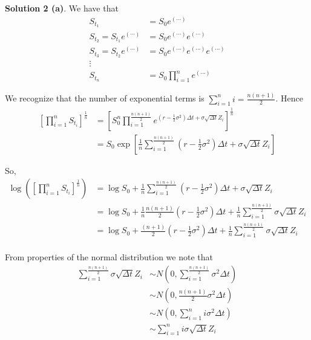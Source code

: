 \documentclass[12pt]{article}
\begin{document}
{\bf Solution 2 (a)}. We have that
\begin{align*}
	S_{t_1} &= S_0 e^{ (\cdots) } \\
	S_{t_2} = S_{t_1}e^{ (\cdots) } &= S_0 e^{ (\cdots) } e^{ (\cdots) } \\
	S_{t_3} = S_{t_2}e^{ (\cdots) } &= S_0 e^{ (\cdots) } e^{ (\cdots) } e^{ (\cdots) } \\	
	\vdots \\
	S_{t_n} &= S_0 \prod^n_{i = 1} e^{(\cdots)}	
\end{align*}

We recognize that the number of exponential terms is $\sum^n_{i = 1} i = \frac{n(n + 1)}{2}$. Hence
\begin{align*}
	\left[ \prod^n_{i = 1} S_{t_i} \right]^\frac{1}{n} &= \left[ S_0^n \prod^\frac{n(n + 1)}{2}_{i = 1} e^{ \left( r - \frac{1}{2}\sigma^2 \right)\Delta t + \sigma\sqrt{\Delta t}Z_i } \right]^\frac{1}{n} \\
	&= S_0 \exp \left[\frac{1}{n} \sum^\frac{n(n + 1)}{2}_{i = 1} \left( r - \frac{1}{2}\sigma^2 \right)\Delta t + \sigma\sqrt{\Delta t} Z_i \right]
\end{align*}

So,
\begin{align*}
	\log \left( \left[ \prod^n_{i = 1} S_{t_i} \right]^\frac{1}{n} \right) &= \log S_0 + \frac{1}{n} \sum^\frac{n(n + 1)}{2}_{i = 1} \left( r - \frac{1}{2}\sigma^2 \right)\Delta t + \sigma\sqrt{\Delta t} Z_i \\
	&=  \log S_0 + \frac{1}{n}\frac{ n(n + 1) }{2}\left( r - \frac{1}{2}\sigma^2 \right)\Delta t + \frac{1}{n} \sum^\frac{n(n + 1)}{2}_{i = 1} \sigma\sqrt{\Delta t} Z_i \\
	&=  \log S_0 + \frac{ (n + 1) }{2}\left( r - \frac{1}{2}\sigma^2 \right)\Delta t + \frac{1}{n} \sum^\frac{n(n + 1)}{2}_{i = 1} \sigma\sqrt{\Delta t} Z_i \\
\end{align*}

From properties of the normal distribution we note that
\begin{align*}
	\sum^\frac{n(n + 1)}{2}_{i = 1} \sigma\sqrt{\Delta t} Z_i &\sim N\left( 0, \sum^\frac{n(n + 1)}{2}_{i = 1} \sigma^2\Delta t \right) \\
	&\sim N\left( 0, \frac{ n(n + 1) }{2} \sigma^2\Delta t \right) \\
	&\sim N \left(0, \sum^n_{i = 1} i \sigma^2\Delta t \right) \\
	&\sim \sum^n_{i = 1} i\sigma\sqrt{\Delta t} Z_i
\end{align*}
\end{document}
